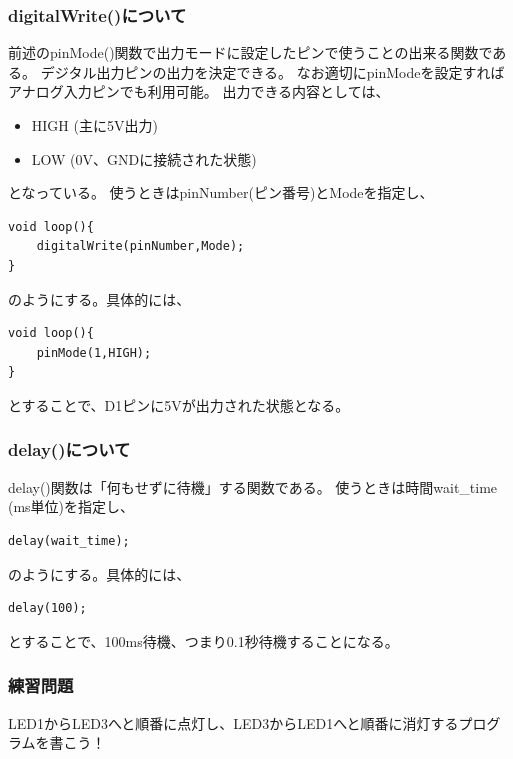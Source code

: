 \documentclass[uplatex]{jsarticle}
\begin{document}
\subsubsection{digitalWrite()について}
前述のpinMode()関数で出力モードに設定したピンで使うことの出来る関数である。
デジタル出力ピンの出力を決定できる。
なお適切にpinModeを設定すればアナログ入力ピンでも利用可能。
出力できる内容としては、
\begin{itemize}
    \item HIGH (主に5V出力)
    \item LOW (0V、GNDに接続された状態)
\end{itemize}
となっている。
使うときはpinNumber(ピン番号)とModeを指定し、
\begin{lstlisting}[basicstyle=\ttfamily\footnotesize, frame=single]
void loop(){
    digitalWrite(pinNumber,Mode);
}
\end{lstlisting}
のようにする。具体的には、
\begin{lstlisting}[basicstyle=\ttfamily\footnotesize, frame=single]
void loop(){
    pinMode(1,HIGH);
}
\end{lstlisting}
とすることで、D1ピンに5Vが出力された状態となる。
\subsubsection{delay()について}
delay()関数は「何もせずに待機」する関数である。
使うときは時間wait\_time (ms単位)を指定し、
\begin{lstlisting}[basicstyle=\ttfamily\footnotesize, frame=single]
delay(wait_time);
\end{lstlisting}
のようにする。具体的には、
\begin{lstlisting}[basicstyle=\ttfamily\footnotesize, frame=single]
delay(100);
\end{lstlisting}
とすることで、100ms待機、つまり0.1秒待機することになる。
\subsubsection{練習問題}
LED1からLED3へと順番に点灯し、LED3からLED1へと順番に消灯するプログラムを書こう！
\clearpage
\end{document}
